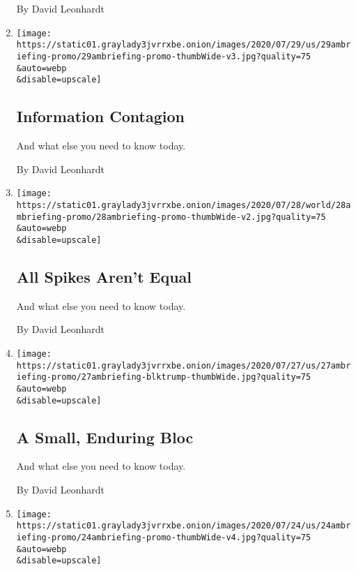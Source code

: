 \begin{enumerate}
  By David Leonhardt
\item
  \href{/2020/07/29/briefing/coronavirus-william-barr-emmy-nominations-your-wednesday-briefing.html}{}

  \texttt{[image: https://static01.graylady3jvrrxbe.onion/images/2020/07/29/us/29ambriefing-promo/29ambriefing-promo-thumbWide-v3.jpg?quality=75\\\&auto=webp\\\&disable=upscale]}

  \hypertarget{information-contagion}{%
  \subsection{Information Contagion}\label{information-contagion}}

  And what else you need to know today.

  By David Leonhardt
\item
  \href{/2020/07/28/briefing/william-barr-mlb-john-lewis.html}{}

  \texttt{[image: https://static01.graylady3jvrrxbe.onion/images/2020/07/28/world/28ambriefing-promo/28ambriefing-promo-thumbWide-v2.jpg?quality=75\\\&auto=webp\\\&disable=upscale]}

  \hypertarget{all-spikes-arent-equal}{%
  \subsection{All Spikes Aren't Equal}\label{all-spikes-arent-equal}}

  And what else you need to know today.

  By David Leonhardt
\item
  \href{/2020/07/27/briefing/john-lewis-portland-coronavirus.html}{}

  \texttt{[image: https://static01.graylady3jvrrxbe.onion/images/2020/07/27/us/27ambriefing-promo/27ambriefing-blktrump-thumbWide.jpg?quality=75\\\&auto=webp\\\&disable=upscale]}

  \hypertarget{a-small-enduring-bloc}{%
  \subsection{A Small, Enduring Bloc}\label{a-small-enduring-bloc}}

  And what else you need to know today.

  By David Leonhardt
\item
  \href{/2020/07/24/briefing/china-alexandria-ocasio-cortez-ufo-your-friday-briefing.html}{}

  \texttt{[image: https://static01.graylady3jvrrxbe.onion/images/2020/07/24/us/24ambriefing-promo/24ambriefing-promo-thumbWide-v4.jpg?quality=75\\\&auto=webp\\\&disable=upscale]}


\end{enumerate}

